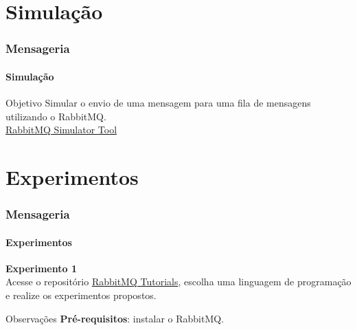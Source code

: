 \documentclass[
	9pt, %
	t, %
]{beamer}
\newcommand{\iconLink}[2]{\href{#1}{\faLink \hspace{0.2em} {#2}}}
\begin{document}

\section{Simulação}

\begin{frame}
	\frametitle{Mensageria}
	\framesubtitle{Simulação}
	\centering

	\begin{block}{Objetivo}
		Simular o envio de uma mensagem para uma fila de mensagens utilizando o RabbitMQ.
		\\ \bigskip
		\iconLink{https://tryrabbitmq.com/}{RabbitMQ Simulator Tool}
	\end{block}

\end{frame}

\section{Experimentos}

\begin{frame}
	\frametitle{Mensageria}
	\framesubtitle{Experimentos}

	{\Large \textbf{Experimento 1}} \\
	
	Acesse o repositório \href{https://github.com/rabbitmq/rabbitmq-tutorials?tab=readme-ov-file}{RabbitMQ Tutorials}, escolha uma linguagem de programação e realize os experimentos propostos.

	\begin{block}{Observações}
		\textbf{Pré-requisitos}: instalar o RabbitMQ.
	\end{block}

\end{frame}



		

		
	
\end{document}
